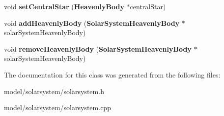 \begin{DoxyCompactItemize}
\item 
void {\bfseries set\-Central\-Star} ({\bf \-Heavenly\-Body} $\ast$central\-Star)\label{df/d5e/classSolarSystem_a468b93dfe340aff47ae7a010020ca365}

\item 
void {\bfseries add\-Heavenly\-Body} ({\bf \-Solar\-System\-Heavenly\-Body} $\ast$solar\-System\-Heavenly\-Body)\label{df/d5e/classSolarSystem_abb8b63f463e770dcd596a5df020ec4be}

\item 
void {\bfseries remove\-Heavenly\-Body} ({\bf \-Solar\-System\-Heavenly\-Body} $\ast$solar\-System\-Heavenly\-Body)\label{df/d5e/classSolarSystem_a20851d16c7fac4274206834c11746b13}

\end{DoxyCompactItemize}


\-The documentation for this class was generated from the following files\-:\begin{DoxyCompactItemize}
\item 
model/solarsystem/solarsystem.\-h\item 
model/solarsystem/solarsystem.\-cpp\end{DoxyCompactItemize}
